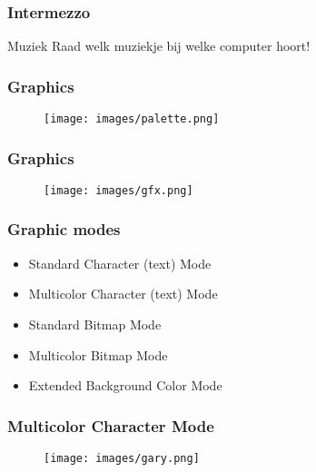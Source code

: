 \documentclass[aspectratio=43]{uva-inf-presentation}
\begin{document}

\begin{frame}
\frametitle{Intermezzo}

\begin{block}{Muziek}
Raad welk muziekje bij welke computer hoort!
\end{block}

\end{frame}


\begin{frame}
\frametitle{Graphics}

\begin{figure}
\texttt{[image: images/palette.png]}
\end{figure}

\end{frame}


\begin{frame}
\frametitle{Graphics}

\begin{figure}
\texttt{[image: images/gfx.png]}
\end{figure}

\end{frame}


\begin{frame}
\frametitle{Graphic modes}

\begin{itemize}
\item Standard Character (text) Mode
\item Multicolor Character (text) Mode
\item Standard Bitmap Mode
\item Multicolor Bitmap Mode
\item Extended Background Color Mode
\end{itemize}

\end{frame}


\begin{frame}
\frametitle{Multicolor Character Mode}

\begin{figure}
\texttt{[image: images/gary.png]}
\end{figure}

\end{frame}
\end{document}
